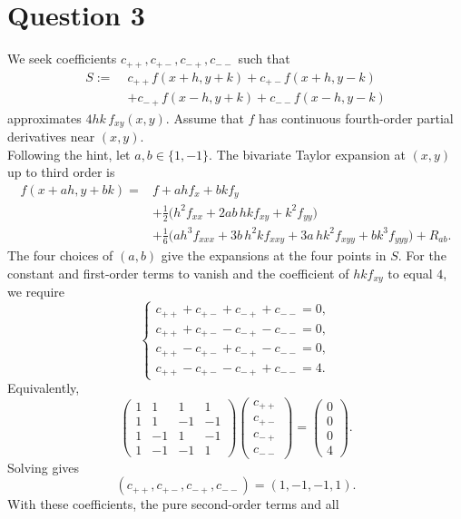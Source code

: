 \documentclass{article}
\begin{document}
\section*{Question 3}
We seek coefficients \(c_{++},c_{+-},c_{-+},c_{--}\) such that
\[
\begin{aligned}
S:=\;&c_{++}f(x+h,y+k)+c_{+-}f(x+h,y-k)\\
&+c_{-+}f(x-h,y+k)+c_{--}f(x-h,y-k)
\end{aligned}
\]
approximates \(4hk\,f_{xy}(x,y)\). Assume that \(f\) has
continuous fourth-order partial derivatives near \((x,y)\).\\
Following the hint, let \(a,b\in\{1,-1\}\). The bivariate Taylor
expansion at \((x,y)\) up to third order is
\[
\begin{aligned}
f(x+ah,y+bk)
={}&f+ahf_x+bkf_y\\
&+\frac12\bigl(h^2f_{xx}+2ab\,hkf_{xy}+k^2f_{yy}\bigr)\\
&+\frac16\bigl(
ah^3f_{xxx}+3b\,h^2kf_{xxy}
+3a\,hk^2f_{xyy}+bk^3f_{yyy}
\bigr)+R_{ab}.
\end{aligned}
\]
The four choices of \((a,b)\) give the expansions at the four
points in \(S\). For the constant and first-order terms to
vanish and the coefficient of \(hkf_{xy}\) to equal \(4\), we
require
\[
\begin{cases}
c_{++}+c_{+-}+c_{-+}+c_{--}=0,\\[2pt]
c_{++}+c_{+-}-c_{-+}-c_{--}=0,\\[2pt]
c_{++}-c_{+-}+c_{-+}-c_{--}=0,\\[2pt]
c_{++}-c_{+-}-c_{-+}+c_{--}=4.
\end{cases}
\]
Equivalently,
\[
\begin{pmatrix}
1&1&1&1\\
1&1&-1&-1\\
1&-1&1&-1\\
1&-1&-1&1
\end{pmatrix}
\begin{pmatrix}
c_{++}\\c_{+-}\\c_{-+}\\c_{--}
\end{pmatrix}
=
\begin{pmatrix}
0\\0\\0\\4
\end{pmatrix}.
\]
Solving gives
\[
(c_{++},c_{+-},c_{-+},c_{--})=(1,-1,-1,1).
\]
With these coefficients, the pure second-order terms and all
\end{document}
